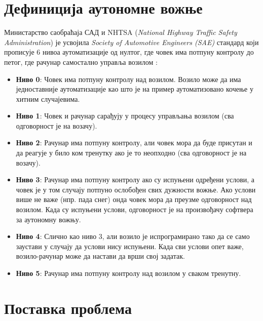 \documentclass[11pt,oneside]{memoir}
\begin{document}
\section{Дефиниција аутономне вожње}

Министарство саобраћаја САД и NHTSA (\textit{National Highway Traffic Safety} \\
\textit{Administration}) је усвојила \textit{Society of Automotive Engineers (SAE)}
стандард који прописује 6 нивоа аутоматизације од нултог, где човек има потпуну контролу до петог, где рачунар самостално управља возилом \cite{ad_survey}:
\begin{itemize}
  \item \textbf{Ниво 0}: Човек има потпуну контролу над возилом. Возило може да има
        једноставније аутоматизације као што је на пример аутоматизовано кочење у хитним случајевима.
  \item \textbf{Ниво 1}: Човек и рачунар сарађују у процесу управљања возилом (сва одговорност је на возачу).
  \item \textbf{Ниво 2}: Рачунар има потпуну контролу, али човек мора да буде присутан и да реагује у било ком тренутку ако је то неопходно (сва одговорност је на возачу).
  \item \textbf{Ниво 3}: Рачунар има потпуну контролу ако су испуњени одређени услови, а човек је у том случају потпуно ослобођен свих дужности вожње. 
         Ако услови више не важе (нпр. пада снег) онда човек мора да преузме одговорност над возилом. 
         Када су испуњени услови, одговорност је на произвођачу софтвера за аутономну вожњу.
  \item \textbf{Ниво 4}: Слично као ниво 3, али возило је испрограмирано тако да се само заустави у случају да услови нису испуњени. 
         Када сви услови опет важе, возило-рачунар може да настави да врши свој задатак.
  \item \textbf{Ниво 5}: Рачунар има потпуну контролу над возилом у сваком тренутну.
\end{itemize}

\section{Поставка проблема}
\end{document}
